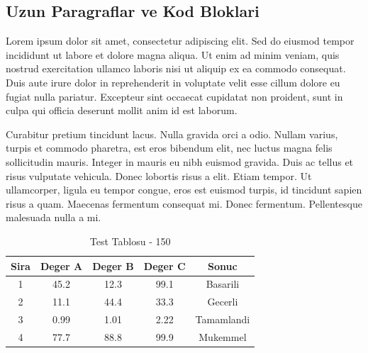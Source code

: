 \documentclass[12pt,a4paper]{article}
\begin{document}
\subsection{Uzun Paragraflar ve Kod Bloklari}
Lorem ipsum dolor sit amet, consectetur adipiscing elit. Sed do eiusmod tempor incididunt ut labore et dolore magna aliqua. Ut enim ad minim veniam, quis nostrud exercitation ullamco laboris nisi ut aliquip ex ea commodo consequat. Duis aute irure dolor in reprehenderit in voluptate velit esse cillum dolore eu fugiat nulla pariatur. Excepteur sint occaecat cupidatat non proident, sunt in culpa qui officia deserunt mollit anim id est laborum.

Curabitur pretium tincidunt lacus. Nulla gravida orci a odio. Nullam varius, turpis et commodo pharetra, est eros bibendum elit, nec luctus magna felis sollicitudin mauris. Integer in mauris eu nibh euismod gravida. Duis ac tellus et risus vulputate vehicula. Donec lobortis risus a elit. Etiam tempor. Ut ullamcorper, ligula eu tempor congue, eros est euismod turpis, id tincidunt sapien risus a quam. Maecenas fermentum consequat mi. Donec fermentum. Pellentesque malesuada nulla a mi.

\begin{table}[h!]
\centering
\begin{tabular}{|c|c|c|c|c|}
\hline
\textbf{Sira} & \textbf{Deger A} & \textbf{Deger B} & \textbf{Deger C} & \textbf{Sonuc} \\
\hline
1 & 45.2 & 12.3 & 99.1 & Basarili \\
2 & 11.1 & 44.4 & 33.3 & Gecerli \\
3 & 0.99 & 1.01 & 2.22 & Tamamlandi \\
4 & 77.7 & 88.8 & 99.9 & Mukemmel \\
\hline
\end{tabular}
\caption{Test Tablosu - 150}
\end{table}

\newpage
\end{document}
